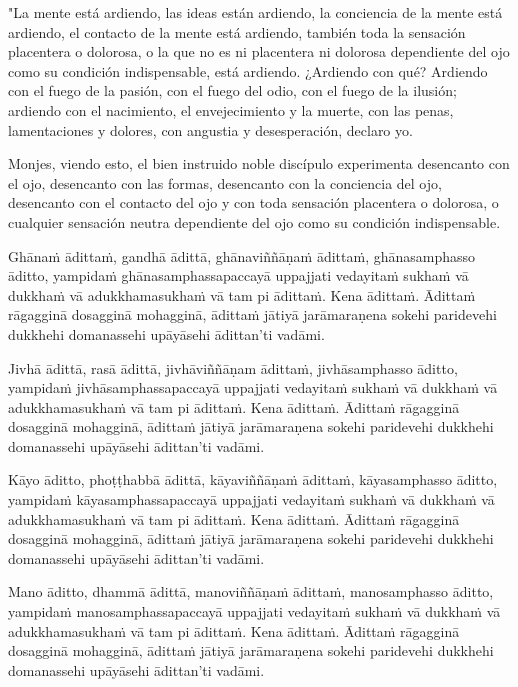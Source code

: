 "La mente está ardiendo, las ideas están ardiendo, la conciencia de la mente está ardiendo, el contacto de la mente está ardiendo, también toda la sensación placentera o dolorosa, o la que no es ni placentera ni dolorosa dependiente del ojo como su condición indispensable, está ardiendo. ¿Ardiendo con qué? Ardiendo con el fuego de la pasión, con el fuego del odio, con el fuego de la ilusión; ardiendo con el nacimiento, el envejecimiento y la muerte, con las penas, lamentaciones y dolores, con angustia y desesperación, declaro yo.

Monjes, viendo esto, el bien instruido noble discípulo experimenta desencanto con el ojo, desencanto con las formas, desencanto con la conciencia del ojo, desencanto con el contacto del ojo y con toda sensación placentera o dolorosa, o cualquier sensación neutra dependiente del ojo como su condición indispensable. 



\clearpage

\paliText
\markboth{\paliTitle}{\rightmark}

Ghānaṁ ādittaṁ, gandhā ādittā, ghānaviññāṇaṁ ādittaṁ, ghānasamphasso
āditto, yampidaṁ ghānasamphassapaccayā uppajjati vedayitaṁ sukhaṁ vā
dukkhaṁ vā adukkhamasukhaṁ vā tam pi ādittaṁ. Kena ādittaṁ. Ādittaṁ
rāgagginā dosagginā mohagginā, ādittaṁ jātiyā jarāmaraṇena sokehi
paridevehi dukkhehi domanassehi upāyāsehi ādittan'ti vadāmi.

Jivhā ādittā, rasā ādittā, jivhāviññāṇam ādittaṁ, jivhāsamphasso āditto,
yampidaṁ jivhāsamphassapaccayā uppajjati vedayitaṁ sukhaṁ vā dukkhaṁ vā
adukkhamasukhaṁ vā tam pi ādittaṁ. Kena ādittaṁ. Ādittaṁ rāgagginā
dosagginā mohagginā, ādittaṁ jātiyā jarāmaraṇena sokehi paridevehi
dukkhehi domanassehi upāyāsehi ādittan'ti vadāmi.

Kāyo āditto, phoṭṭhabbā ādittā, kāyaviññāṇaṁ ādittaṁ, kāyasamphasso
āditto, yampidaṁ kāyasamphassapaccayā uppajjati vedayitaṁ sukhaṁ vā
dukkhaṁ vā adukkhamasukhaṁ vā tam pi ādittaṁ. Kena ādittaṁ. Ādittaṁ
rāgagginā dosagginā mohagginā, ādittaṁ jātiyā jarāmaraṇena sokehi
paridevehi dukkhehi domanassehi upāyāsehi ādittan'ti vadāmi.

Mano āditto, dhammā ādittā, manoviññāṇaṁ ādittaṁ, manosamphasso āditto,
yampidaṁ manosamphassapaccayā uppajjati vedayitaṁ sukhaṁ vā dukkhaṁ vā
adukkhamasukhaṁ vā tam pi ādittaṁ. Kena ādittaṁ. Ādittaṁ rāgagginā
dosagginā mohagginā, ādittaṁ jātiyā jarāmaraṇena sokehi paridevehi
dukkhehi domanassehi upāyāsehi ādittan'ti vadāmi.

\enlargethispage{2\baselineskip}

